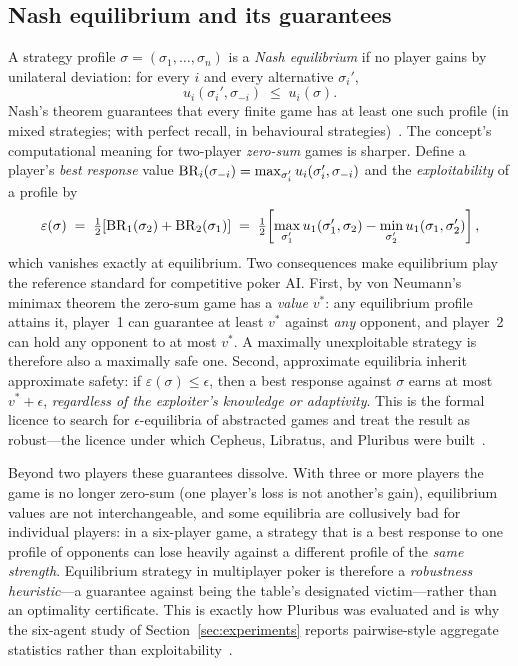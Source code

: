 \subsection{Nash equilibrium and its guarantees}\label{sec:nash}

A strategy profile $\sigma = (\sigma_1, \dots, \sigma_n)$ is a \emph{Nash equilibrium} if no player gains by unilateral deviation: for every $i$ and every alternative $\sigma_i'$,
\begin{equation}\label{eq:nash}
u_i(\sigma_i', \sigma_{-i}) \;\le\; u_i(\sigma).
\end{equation}
Nash's theorem guarantees that every finite game has at least one such profile (in mixed strategies; with perfect recall, in behavioural strategies)~\cite{nash1950equilibrium}. The concept's computational meaning for two-player \emph{zero-sum} games is sharper. Define a player's \emph{best response} value $\operatorname{\mathrm{BR}}_i(\sigma_{-i}) = \max_{\sigma_i'} u_i(\sigma_i', \sigma_{-i})$ and the \emph{exploitability} of a profile by
\begin{equation}\label{eq:expl}
\varepsilon(\sigma) \;=\; \tfrac12\!\left[\operatorname{\mathrm{BR}}_1(\sigma_2) + \operatorname{\mathrm{BR}}_2(\sigma_1)\right] \;=\; \tfrac12\!\left[\max_{\sigma_1'} u_1(\sigma_1', \sigma_2) - \min_{\sigma_2'} u_1(\sigma_1, \sigma_2')\right],
\end{equation}
which vanishes exactly at equilibrium. Two consequences make equilibrium play the reference standard for competitive poker AI. First, by von Neumann's minimax theorem the zero-sum game has a \emph{value} $v^*$: any equilibrium profile attains it, player~1 can guarantee at least $v^*$ against \emph{any} opponent, and player~2 can hold any opponent to at most $v^*$. A maximally unexploitable strategy is therefore also a maximally safe one. Second, approximate equilibria inherit approximate safety: if $\varepsilon(\sigma) \le \epsilon$, then a best response against $\sigma$ earns at most $v^* + \epsilon$, \emph{regardless of the exploiter's knowledge or adaptivity}. This is the formal licence to search for $\epsilon$-equilibria of abstracted games and treat the result as robust---the licence under which Cepheus, Libratus, and Pluribus were built~\cite{bowling2015ceph,brown2017libratus,brown2019pluribus}.

Beyond two players these guarantees dissolve. With three or more players the game is no longer zero-sum (one player's loss is not another's gain), equilibrium values are not interchangeable, and some equilibria are collusively bad for individual players: in a six-player game, a strategy that is a best response to one profile of opponents can lose heavily against a different profile of the \emph{same strength}. Equilibrium strategy in multiplayer poker is therefore a \emph{robustness heuristic}---a guarantee against being the table's designated victim---rather than an optimality certificate. This is exactly how Pluribus was evaluated and is why the six-agent study of Section~\ref{sec:experiments} reports pairwise-style aggregate statistics rather than exploitability~\cite{brown2019pluribus}.

